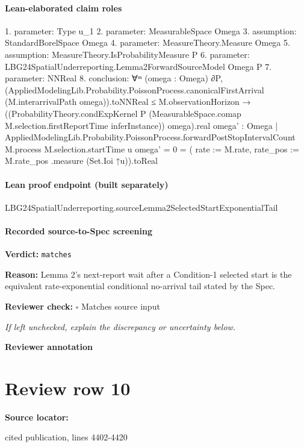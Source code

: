 \documentclass[10pt]{article}
\newcommand{\reviewerbox}{%
  \par\noindent\fbox{\parbox{0.96\linewidth}{\rule{0pt}{0.38in}}}\par
}
\newcommand{\reviewmatch}[1]{%
  \par\noindent\textbf{Reviewer check:} $\square$\; #1\par
  \noindent\emph{If left unchecked, explain the discrepancy or uncertainty below.}\par
}
\begin{document}
\paragraph{Lean-elaborated claim roles}\begin{ReviewVerbatim}
1. parameter: Type u_1
2. parameter: MeasurableSpace Omega
3. assumption: StandardBorelSpace Omega
4. parameter: MeasureTheory.Measure Omega
5. assumption: MeasureTheory.IsProbabilityMeasure P
6. parameter: LBG24SpatialUnderreporting.Lemma2ForwardSourceModel Omega P
7. parameter: NNReal
8. conclusion: ∀ᵐ (omega : Omega) ∂P,
  (AppliedModelingLib.Probability.PoissonProcess.canonicalFirstArrival (M.interarrivalPath omega)).toNNReal ≤
      M.observationHorizon →
    ((ProbabilityTheory.condExpKernel P (MeasurableSpace.comap M.selection.firstReportTime inferInstance)) omega).real
        {omega' : Omega |
          AppliedModelingLib.Probability.PoissonProcess.forwardPostStopIntervalCount M.process M.selection.startTime u
              omega' =
            0} =
      ({ rate := M.rate, rate_pos := M.rate_pos }.measure (Set.Ioi ↑u)).toReal
\end{ReviewVerbatim}

\paragraph{Lean proof endpoint (built separately)}\begin{ReviewVerbatim}
LBG24SpatialUnderreporting.sourceLemma2SelectedStartExponentialTail
\end{ReviewVerbatim}

\paragraph{Recorded source-to-Spec screening}
\textbf{Verdict:} \texttt{matches}
\\
{\raggedright
\textbf{Reason:} Lemma 2's next-\allowbreak{}report wait after a Condition-\allowbreak{}1 selected start is the equivalent rate-\allowbreak{}exponential conditional no-\allowbreak{}arrival tail stated by the Spec.\allowbreak{}
\par}
\reviewmatch{Matches source input}
\noindent\textbf{Reviewer annotation}\par
\reviewerbox
\clearpage
\hypertarget{source-claim-7c756377fe4100a9}{}
\section*{Review row 10}
\textbf{Source locator:} {\footnotesize\raggedright cited publication, lines 4402-\allowbreak{}4420\par}
\end{document}
